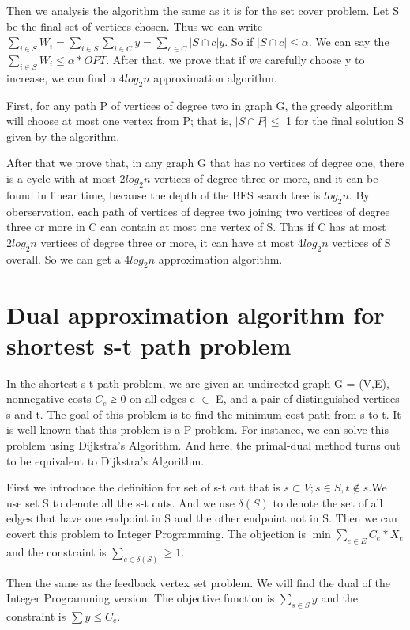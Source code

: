 \documentclass[usletter]{article}
\begin{document}
Then we analysis the algorithm the same as it is for the set cover problem. Let S be the final set of vertices chosen. Thus we can write $\sum_{i \in S}{W_i} = \sum_{i \in S}{\sum_{i \in C}{y}}= \sum_{c \in C}{|S \cap c| y}$. So if $|S \cap c| \le \alpha$. We can say the $\sum_{i \in S}{W_i} \le \alpha * OPT$. After that, we prove that if we carefully choose y to increase, we can find a $4log_2{n}$ approximation algorithm.

First, for any path P of vertices of degree two in graph G, the greedy algorithm will choose at most one vertex from P; that is, $|S \cap P| \le$  1 for the final solution S given by the algorithm.

After that we prove that, in any graph G that has no vertices of degree one, there is a cycle with at most 2$log_2{n}$ vertices of degree three or more, and it can be found in linear time, because the depth of the BFS search tree is $log_2{n}$. By oberservation, each path of vertices of degree two joining two vertices of degree three or more in C can contain at most one vertex of S. Thus if C has at most $2log_2{n}$ vertices of degree three or more, it can have at most 4$log_2{n}$ vertices of S overall. So we can get a $4log_2{n}$ approximation algorithm.

\section{Dual approximation algorithm for shortest s-t path problem}
In the shortest s-t path problem, we are given an undirected graph G = (V,E), nonnegative costs $C_e$ ≥ 0 on all edges e $\in$ E, and a pair of distinguished vertices s and t. The goal of this problem is to find the minimum-cost path from s to t.  It is well-known that this problem is a P problem. For instance, we can solve this problem using Dijkstra's Algorithm. And here, the primal-dual method turns out to be equivalent to Dijkstra's Algorithm.

First we introduce the definition for set of s-t cut that is  $s \subset V; s \in S,t \notin s$.We use set S to denote all the s-t cuts.  And we use $\delta(S)$ to denote the set of all edges that have one endpoint in S and the other endpoint not in S. Then we can covert this problem to Integer Programming. The objection is $\min{\sum_{e \in E}{C_e*X_e}}$ and the constraint is $\sum_{e \in \delta(S)} \ge 1$.

Then the same as the feedback vertex set problem. We will find the dual of the Integer Programming version.
The objective function is $\sum_{s \in S}{y}$ and the constraint is $\sum{y} \le C_e$.
\end{document}
